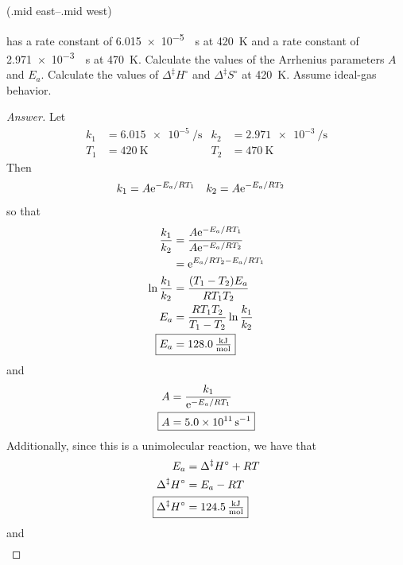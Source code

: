 \documentclass[../psets.tex]{subfiles}
\begin{document}
\begin{enumerate}[label={\textbf{28-\arabic*.}},leftmargin=3.5em]
\begin{center}
            \arrow(.mid east--.mid west)
        \schemestop
    \end{center}
    has a rate constant of \SI{6.015e-5}{\per\second} at \SI{420}{\kelvin} and a rate constant of \SI{2.971e-3}{\per\second} at \SI{470}{\kelvin}. Calculate the values of the Arrhenius parameters $A$ and $E_a$. Calculate the values of $\Delta^\ddagger H^\circ$ and $\Delta^\ddagger S^\circ$ at \SI{420}{\kelvin}. Assume ideal-gas behavior.
    \begin{proof}[Answer]
        Let
        \begin{align*}
            k_1 &= \SI{6.015e-5}{\per\second}&
                k_2 &= \SI{2.971e-3}{\per\second}\\
            T_1 &= \SI{420}{\kelvin}&
                T_2 &= \SI{470}{\kelvin}
        \end{align*}
        Then
        \begin{align*}
            k_1 &= A\e[-E_a/RT_1]&
            k_2 &= A\e[-E_a/RT_2]
        \end{align*}
        so that
        \begin{align*}
            \frac{k_1}{k_2} &= \frac{A\e[-E_a/RT_1]}{A\e[-E_a/RT_2]}\\
            &= \e[E_a/RT_2-E_a/RT_1]\\
            \ln\frac{k_1}{k_2} &= \frac{(T_1-T_2)E_a}{RT_1T_2}\\
            E_a &= \frac{RT_1T_2}{T_1-T_2}\ln\frac{k_1}{k_2}\\
            \Aboxed{E_a &= \SI[per-mode=fraction,fraction-function=\tfrac]{128.0}{\kilo\joule\per\mole}}
        \end{align*}
        and
        \begin{align*}
            A &= \frac{k_1}{\e[-E_a/RT_1]}\\
            \Aboxed{A &= \SI{5.0e11}{\per\second}}
        \end{align*}
        Additionally, since this is a unimolecular reaction, we have that
        \begin{align*}
            E_a &= \Delta^\ddagger H^\circ+RT\\
            \Delta^\ddagger H^\circ &= E_a-RT\\
            \Aboxed{\Delta^\ddagger H^\circ &= \SI[per-mode=fraction,fraction-function=\tfrac]{124.5}{\kilo\joule\per\mole}}
        \end{align*}
        and
        \begin{align*}

\end{align*}
\end{proof}
\end{enumerate}
\end{document}
